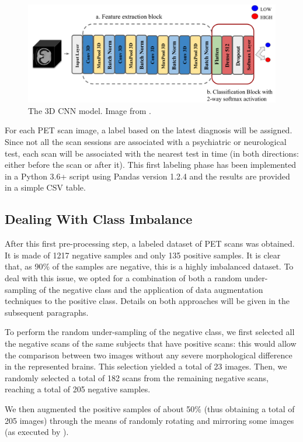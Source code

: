 \documentclass[10pt,twocolumn,letterpaper]{article}
\begin{document}
\begin{figure}[t]
  \centering
  \includegraphics[width=0.8\linewidth]{images/network.pdf}
  \caption[The 3D CNN model]{The 3D CNN model. Image from \cite{Zunair2020}.}
  \label{fig:model}
\end{figure}

For each PET scan image, a label based on the latest diagnosis will be assigned.
Since not all the scan sessions are associated with a psychiatric or
neurological test, each scan will be associated with the nearest test in time
(in both directions: either before the scan or after it). This first labeling
phase has been implemented in a Python 3.6+ script using Pandas version 1.2.4
\cite{Pandas-v1.2.4} and the results are provided in a simple CSV table.

\subsection{Dealing With Class Imbalance}
\label{sec:dealing-with-class}

After this first pre-processing step, a labeled dataset of PET scans was
obtained. It is made of 1217 negative samples and only 135 positive samples. It
is clear that, as 90\% of the samples are negative, this is a highly imbalanced
dataset. To deal with this issue, we opted for a combination of both a random
under-sampling of the negative class \cite{Japkowicz2002} and the application of
data augmentation techniques to the positive class. Details on both approaches
will be given in the subsequent paragraphs.

To perform the random under-sampling of the negative class, we first selected
all the negative scans of the same subjects that have positive scans: this would
allow the comparison between two images without any severe morphological
difference in the represented brains. This selection yielded a total of 23
images. Then, we randomly selected a total of 182 scans from the remaining
negative scans, reaching a total of 205 negative samples.

We then augmented the positive samples of about 50\% (thus obtaining a total of
205 images) through the means of randomly rotating and mirroring some images (as
executed by \cite{Altay2020}).
\end{document}
